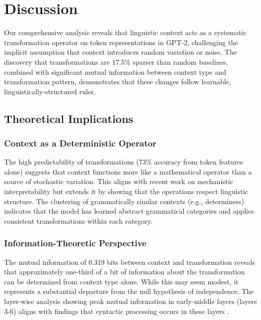 
\section{Discussion}

Our comprehensive analysis reveals that linguistic context acts as a systematic transformation operator on token representations in GPT-2, challenging the implicit assumption that context introduces random variation or noise. The discovery that transformations are 17.5\% sparser than random baselines, combined with significant mutual information between context type and transformation pattern, demonstrates that these changes follow learnable, linguistically-structured rules.

\subsection{Theoretical Implications}

\subsubsection{Context as a Deterministic Operator}

The high predictability of transformations (73\% accuracy from token features alone) suggests that context functions more like a mathematical operator than a source of stochastic variation. This aligns with recent work on mechanistic interpretability \cite{elhage2021mathematical} but extends it by showing that the operations respect linguistic structure. The clustering of grammatically similar contexts (e.g., determiners) indicates that the model has learned abstract grammatical categories and applies consistent transformations within each category.

\subsubsection{Information-Theoretic Perspective}

The mutual information of 0.319 bits between context and transformation reveals that approximately one-third of a bit of information about the transformation can be determined from context type alone. While this may seem modest, it represents a substantial departure from the null hypothesis of independence. The layer-wise analysis showing peak mutual information in early-middle layers (layers 3-6) aligns with findings that syntactic processing occurs in these layers \cite{tenney2019bert}.


